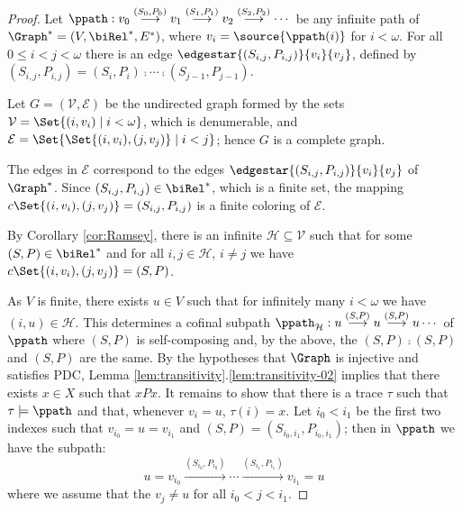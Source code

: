 \begin{proof}
Let $\ppath : v_0 \stackrel{(S_0,P_0)}{\longrightarrow} v_1 \stackrel{(S_1,P_1)}{\longrightarrow} v_2 \stackrel{(S_2,P_2)}{\longrightarrow}\cdots$
be any infinite path of $\Graph^* = (V, \biRel^*, E^*)$, where $v_i = \source{\ppath(i)}$ for $i < \omega$.
For all $0 \leq i < j < \omega$ there is an edge $\edgestar{(S_{i,j}, P_{i,j})}{v_i}{v_j}$, 
defined by
$(S_{i,j}, P_{i,j}) = (S_{i}, P_{i}) \comp \cdots \comp (S_{j-1}, P_{j-1})$.

Let $G = (\mathcal{V}, \mathcal{E})$ be the undirected graph formed by the sets
$\mathcal{V} = \Set{(i, v_i) \mid i < \omega}$, which is denumerable, and $\mathcal{E} = \Set{\Set{(i, v_i), (j, v_j)} \mid i < j}$; hence $G$ is a complete graph.

The edges in $\mathcal{E}$ correspond
to the edges $\edgestar{(S_{i,j}, P_{i,j})}{v_i}{v_j}$ of $\Graph^*$. 
Since $(S_{i,j}, P_{i,j}) \in \biRel^*$, which is a finite set, the mapping
$c\Set{(i, v_i), (j, v_j)} = (S_{i,j}, P_{i,j})$ is a finite coloring of $\mathcal{E}$.

By Corollary \ref{cor:Ramsey}, there is an infinite $\mathcal{H} \subseteq \mathcal{V}$ such that for some $(S, P) \in \biRel^*$ and for all $i, j \in \mathcal{H}$, $i \not  = j$ we have
$c\Set{(i, v_i), (j, v_j)} = (S, P)$. 

As $V$ is finite, there exists $u \in V$ such that for infinitely many $i < \omega$
we have $(i, u) \in \mathcal{H}$.
This determines a cofinal subpath $\ppath_{\mathcal{H}} : u \stackrel{(S,P)}{\longrightarrow} u \stackrel{(S,P)}{\longrightarrow} u \cdots$ of $\ppath$ where $(S,P)$ is self-composing and, by the above, the  $(S,P)\comp (S,P)$ and $ (S,P)$ are the same.
By the hypotheses that $\Graph$ is
injective and satisfies PDC, Lemma \ref{lem:transitivity}.\ref{lem:transitivity-02} 
implies that there exists $x \in X$ such that $x P x$.  
It remains to show that there is a trace $\tau$ such that $\tau \models \ppath$ and that, whenever $v_i = u$, $\tau(i) = x$.
Let $i_0 < i_1$ be the first two indexes such that $v_{i_0} = u = v_{i_1}$ and $(S,P) = (S_{i_0,i_1},P_{i_0,i_1})$; then in $\ppath$ we have the subpath:
\[u = v_{i_0} \stackrel{(S_{i_0},P_{i_0})}{\longrightarrow} \cdots \stackrel{(S_{i_1},P_{i_1})}{\longrightarrow} v_{i_1} = u \]
where we assume that the $v_j \neq u$ for all $i_0 < j < i_1$. 


\end{proof}
